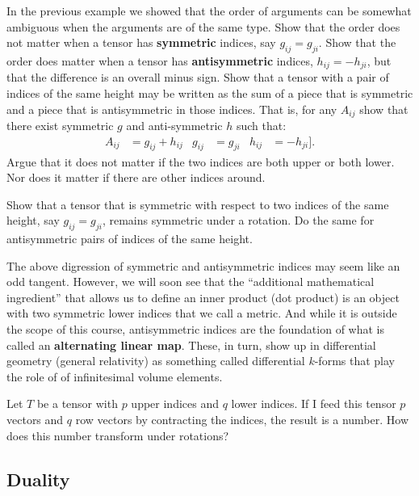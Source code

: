 \documentclass[12pt]{article}
\begin{document}
\begin{exercise}
In the previous example we showed that the order of arguments can be somewhat ambiguous when the arguments are of the same type. Show that the order does not matter when a tensor has \textbf{symmetric} indices, say $g_{ij} = g_{ji}$. Show that the order does matter when a tensor has \textbf{antisymmetric} indices, $h_{ij} = -h_{ji}$, but that the difference is an overall minus sign. Show that a tensor with a pair of indices of the same height may be written as the sum of a piece that is symmetric and a piece that is antisymmetric in those indices. That is, for any $A_{ij}$ show that there exist symmetric $g$ and anti-symmetric $h$ such that:
\begin{align}
    A_{ij} &= g_{ij} + h_{ij}
    &
    g_{ij} &= g_{ji} 
    &
    h_{ij} &= -h_{ji} ] .
\end{align}
Argue that it does not matter if the two indices are both upper or both lower. Nor does it matter if there are other indices around.
\end{exercise}

\begin{exercise}
Show that a tensor that is symmetric with respect to two indices of the same height, say $g_{ij} = g_{ji}$, remains symmetric under a rotation. Do the same for antisymmetric pairs of indices of the same height.
\end{exercise}

The above digression of symmetric and antisymmetric indices may seem like an odd tangent. However, we will soon see that the ``additional mathematical ingredient'' that allows us to define an inner product (dot product) is an object with two symmetric lower indices that we call a metric. And while it is outside the scope of this course, antisymmetric indices are the foundation of what is called an \textbf{alternating linear map}. These, in turn, show up in differential geometry (general relativity) as something called differential $k$-forms that play the role of of infinitesimal volume elements.

\begin{exercise}
Let $T$ be a tensor with $p$ upper indices and $q$ lower indices. If I feed this tensor $p$ vectors and $q$ row vectors by contracting the indices, the result is a number. How does this number transform under rotations?
\end{exercise}


\subsection{Duality}
\end{document}
